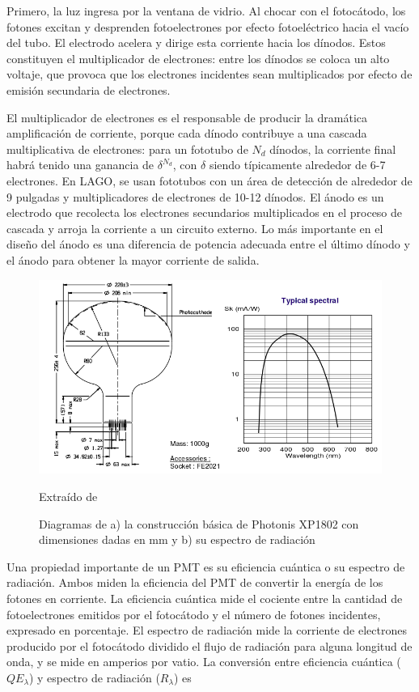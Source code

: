 \documentclass{book}
\begin{document}
Primero, la  luz ingresa por la ventana de vidrio. Al chocar con el fotoc\'atodo, los fotones excitan y desprenden fotoelectrones por efecto fotoel\'ectrico hacia el vac\'io del tubo. El electrodo acelera y dirige esta corriente hacia los d\'inodos. Estos constituyen el multiplicador de electrones: entre los d\'inodos se coloca un alto voltaje, que provoca que los electrones incidentes sean multiplicados por efecto de emisi\'on secundaria de electrones. \citep{Hamamatsu}

El multiplicador de electrones es el responsable de producir la dram\'atica amplificaci\'on de corriente, porque cada d\'inodo contribuye a una cascada multiplicativa de electrones: para un fototubo de $N_d$ d\'inodos, la corriente final habr\'a tenido una ganancia de $\delta^{N_d}$, con $\delta$ siendo t\'ipicamente alrededor de 6-7 electrones. En LAGO, se usan fototubos con un \'area de detecci\'on de alrededor de 9 pulgadas y multiplicadores de electrones de 10-12 d\'inodos. El \'anodo es un electrodo que recolecta los electrones secundarios multiplicados en el proceso de cascada y arroja la corriente a un circuito externo. Lo m\'as importante en el dise\~no del \'anodo es una diferencia de potencia adecuada entre el \'ultimo d\'inodo y el \'anodo para obtener la mayor corriente de salida. \citep{Hamamatsu}

\begin{figure}[ht] %
\begin{center}
 \includegraphics[width =0.8\linewidth]{PhotonisXP1802.png}
 
 Extra\'ido de \citep{Photonis}
\caption{Diagramas de a) la construcci\'on b\'asica de Photonis XP1802 con dimensiones dadas en mm y b) su espectro de radiaci\'on}
\end{center}
\end{figure}

Una propiedad importante de un PMT es su eficiencia cu\'antica o su espectro de radiaci\'on. Ambos miden la eficiencia del PMT de convertir la energ\'ia de los fotones en corriente. La eficiencia cu\'antica mide el cociente entre la cantidad de fotoelectrones emitidos por el fotoc\'atodo y el n\'umero de fotones incidentes, expresado en porcentaje. El espectro de radiaci\'on mide la corriente de electrones producido por el fotoc\'atodo dividido el flujo de radiaci\'on para alguna longitud de onda, y se mide en amperios por vatio. La conversi\'on entre eficiencia cu\'antica ($QE_\lambda$) y espectro de radiaci\'on ($R_\lambda$) es
\end{document}
